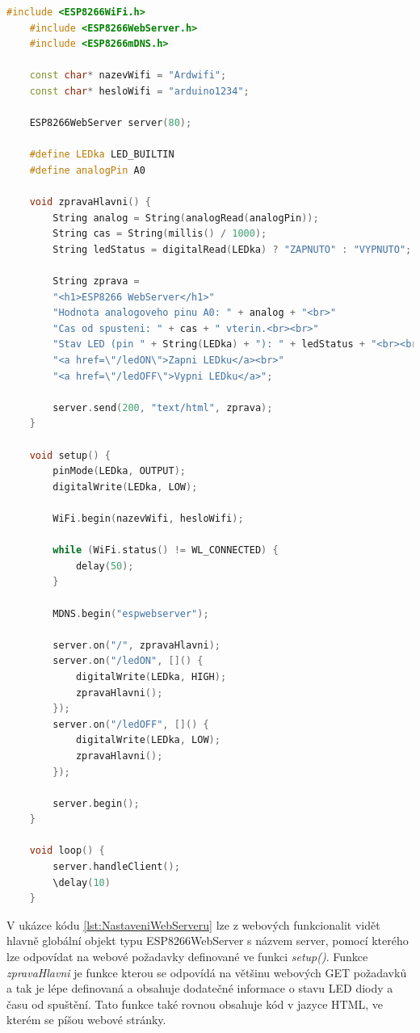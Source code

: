 \begin{lstlisting}[language=C++, caption={Nastavení ESP8266 WebServeru pro ovládání LED diody \cite{NavodNaESPWebServerDratek}}, label={lst:NastaveniWebServeru}]
	#include <ESP8266WiFi.h>
	#include <ESP8266WebServer.h>
	#include <ESP8266mDNS.h>

	const char* nazevWifi = "Ardwifi";
	const char* hesloWifi = "arduino1234";

	ESP8266WebServer server(80);

	#define LEDka LED_BUILTIN
	#define analogPin A0

	void zpravaHlavni() {
		String analog = String(analogRead(analogPin));
		String cas = String(millis() / 1000);
		String ledStatus = digitalRead(LEDka) ? "ZAPNUTO" : "VYPNUTO";

		String zprava =
		"<h1>ESP8266 WebServer</h1>"
		"Hodnota analogoveho pinu A0: " + analog + "<br>"
		"Cas od spusteni: " + cas + " vterin.<br><br>"
		"Stav LED (pin " + String(LEDka) + "): " + ledStatus + "<br><br>"
		"<a href=\"/ledON\">Zapni LEDku</a><br>"
		"<a href=\"/ledOFF\">Vypni LEDku</a>";

		server.send(200, "text/html", zprava);
	}

	void setup() {
		pinMode(LEDka, OUTPUT);
		digitalWrite(LEDka, LOW);

		WiFi.begin(nazevWifi, hesloWifi);

		while (WiFi.status() != WL_CONNECTED) {
			delay(50);
		}

		MDNS.begin("espwebserver");

		server.on("/", zpravaHlavni);
		server.on("/ledON", []() {
			digitalWrite(LEDka, HIGH);
			zpravaHlavni();
		});
		server.on("/ledOFF", []() {
			digitalWrite(LEDka, LOW);
			zpravaHlavni();
		});

		server.begin();
	}

	void loop() {
		server.handleClient();
		\delay(10)
	}
\end{lstlisting}

V ukázce kódu \ref{lst:NastaveniWebServeru} lze z webových funkcionalit vidět hlavně globální objekt typu ESP8266WebServer s názvem server, pomocí kterého lze odpovídat na webové požadavky definované ve funkci \textit{setup()}. Funkce \textit{zpravaHlavni} je funkce kterou se odpovídá na většinu webových GET požadavků a tak je lépe definovaná a obsahuje dodatečné informace o stavu LED diody a času od spuštění. Tato funkce také rovnou obsahuje kód v jazyce HTML, ve kterém se píšou webové stránky.

